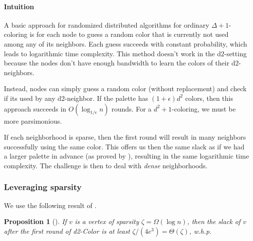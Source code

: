 \documentclass[12pt]{article}
\newtheorem{proposition}[theorem]{Proposition}
\begin{document}
\paragraph*{Intuition}
A basic approach for randomized distributed algorithms for ordinary $\Delta+1$-coloring is for each node to guess a random color that is currently not used among any of its neighbors. Each guess succeeds with constant probability, which leads to logarithmic time complexity. This method doesn't work in the d2-setting because the nodes don't have enough bandwidth to learn the colors of their d2-neighbors.

Instead, nodes can simply guess a random color (without replacement) and check if its used by any d2-neighbor. If the palette has $(1+\epsilon)d^2$ colors, then this approach succeeds in $O(\log_{1/\epsilon} n)$ rounds. For a $d^2+1$-coloring, we must be more parsimonious. 

If each neighborhood is sparse, then the first round will result in many neighbors successfully using the same color. 
This offers us then the same slack as if we had a larger palette in advance (as proved by \cite{EPS15}), resulting in the same logarithmic
time complexity.
The challenge is then to deal with \emph{dense} neighborhoods. 

\subsubsection{Leveraging sparsity} 
We use the following result of \cite{EPS15}.

\begin{proposition}[\cite{EPS15}]
If $v$ is a vertex of sparsity $\zeta = \Omega(\log n)$, then the slack of $v$ after the first round of d2-Color is at least $\zeta/(4 e^3) = \Theta(\zeta)$, w.h.p.
\iffalse
Let $v$ be a vertex of sparsity $\zeta$ and let $Z$ be the slack of $v$ after the first round of d2-Color. Then, 
\[ \Pr[Z \le \zeta/(4 e^3)] \le e^{\Omega(\zeta)}\ . \]
\fi
\label{prop:sparsity}
\end{proposition}
\end{document}
